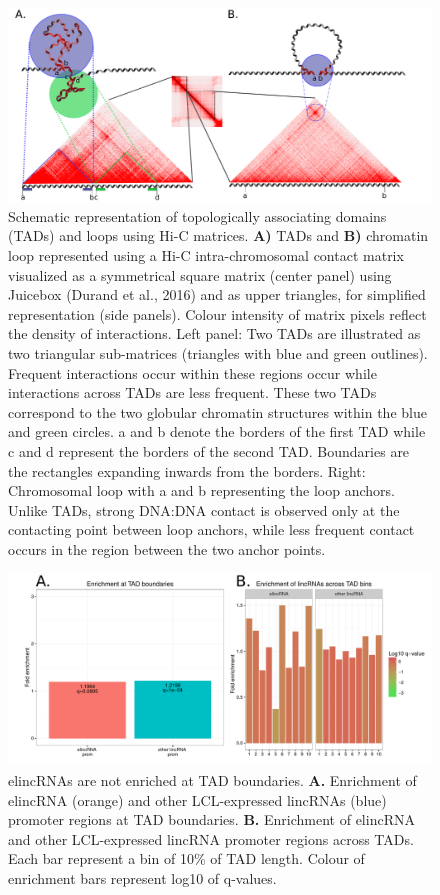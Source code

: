 \documentclass[11pt,a4paper]{report}
\begin{document}
\begin{figure}[ht]
	\includegraphics[width=1\textwidth]{Figures/3_TAD_loop_definition.pdf}
	\caption{Schematic representation of topologically associating domains (TADs) and loops using Hi-C matrices. \textbf{A)} TADs and \textbf{B)} chromatin loop represented using a Hi-C intra-chromosomal contact matrix visualized as a symmetrical square matrix (center panel) using Juicebox (Durand et al., 2016)⁠ and as upper triangles, for simplified representation (side panels). Colour intensity of matrix pixels reflect the density of interactions. Left panel: Two TADs are illustrated as two triangular sub-matrices (triangles with blue and green outlines). Frequent interactions occur within these regions occur while interactions across TADs are less frequent. These two TADs correspond to the two globular chromatin structures within the blue and green circles. a and b denote the borders of the first TAD while c and d represent the borders of the second TAD. Boundaries are the rectangles expanding inwards from the borders. Right: Chromosomal loop with a and b representing the loop anchors. Unlike TADs, strong DNA:DNA contact is observed only at the contacting point between loop anchors, while less frequent contact occurs in the region between the two anchor points. }
	\label{TAD_loop_def}
\end{figure}

\begin{figure}[ht]
	\includegraphics[width=1\textwidth]{Figures/4_enrich_boundaries.pdf}
	\caption{elincRNAs are not enriched at TAD boundaries. \textbf{A.} Enrichment of elincRNA (orange) and other LCL-expressed lincRNAs (blue) promoter regions at TAD boundaries. \textbf{B.} Enrichment of elincRNA and other LCL-expressed lincRNA promoter regions across TADs. Each bar represent a bin of 10\% of TAD length. Colour of enrichment bars represent log10 of q-values. }
	\label{enrich_boundaries}
\end{figure}
\end{document}
